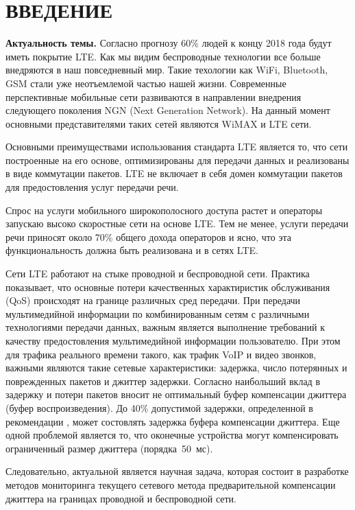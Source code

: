 \chapter*{ВВЕДЕНИЕ}							%

\textbf{Актуальность темы.} Согласно прогнозу \cite{ericsson} 60\% людей к концу 2018 года будут иметь покрытие LTE. Как мы видим беспроводные технологии все больше внедряются в наш повседневный мир. Такие техологии как WiFi, Bluetooth, GSM стали уже неотъемлемой частью нашей жизни. 
Современные перспективные мобильные сети развиваются в направлении внедрения следующего поколения NGN (Next Generation Network). На данный момент основными представителями таких сетей являются WiMAX и LTE сети.

Основными преимуществами использования стандарта LTE является то, что сети построенные на его основе, оптимизированы для передачи данных и реализованы в виде коммутации пакетов.
LTE не включает в себя домен коммутации пакетов для предостовления услуг передачи речи.

Спрос на услуги мобильного широкополосного доступа растет и операторы запускаю высоко скоростные сети на основе LTE. 
Тем не менее, услуги передачи речи приносят около 70\% общего дохода операторов и ясно, что эта функциональность должна быть реализована и в сетях LTE.

Сети LTE работают на стыке проводной и беспроводной сети. Практика показывает, что основные потери качественных характиристик обслуживания (QoS) происходят на границе различных сред передачи.
При передачи мультимедийной информации по комбинированным сетям с различными технологиями передачи данных, важным является выполнение требований к качеству предостовления мультимедийной информации пользователю.
При этом для трафика реального времени такого, как трафик VoIP и видео звонков, важными являются такие сетевые характеристики:
задержка, число потерянных и поврежденных пакетов и джиттер задержки.
Согласно \cite{rokovoy} наибольший вклад в задержку и потери пакетов вносит не оптимальный буфер компенсации джиттера (буфер воспроизведения). До 40\% допустимой задержки, определенной в рекомендации \cite{G114}, может состовлять задержка буфера компенсации джиттера.
Еще одной проблемой является то, что оконечные устройства могут компенсировать ограниченный размер джиттера (порядка~50~мс).

Следовательно, актуальной является научная задача, которая состоит в разработке методов мониторинга текущего сетевого метода предварительной компенсации джиттера на границах проводной и беспроводной сети.


